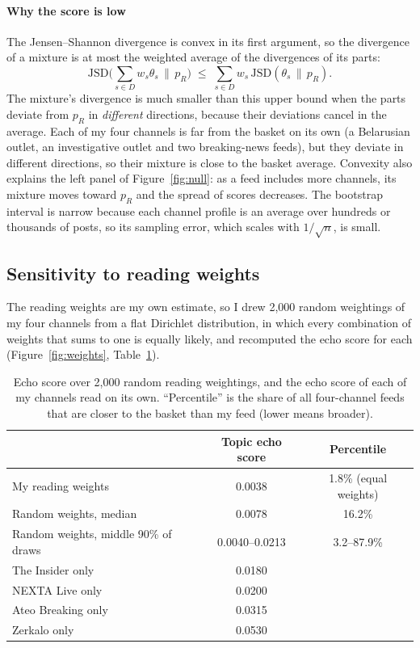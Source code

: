 \documentclass[11pt,a4paper]{article}
\newcommand{\JSD}{\mathrm{JSD}}
\begin{document}
\paragraph{Why the score is low} The Jensen--Shannon divergence is convex in its first argument, so the divergence of a mixture is at most the weighted average of the divergences of its parts:
\begin{equation}
\JSD\Big(\sum_{s\in D} w_s\theta_s \,\Big\|\, p_R\Big) \;\leq\; \sum_{s\in D} w_s\, \JSD(\theta_s\,\|\,p_R).
\end{equation}
The mixture's divergence is much smaller than this upper bound when the parts deviate from $p_R$ in \emph{different} directions, because their deviations cancel in the average. Each of my four channels is far from the basket on its own (a Belarusian outlet, an investigative outlet and two breaking-news feeds), but they deviate in different directions, so their mixture is close to the basket average. Convexity also explains the left panel of Figure~\ref{fig:null}: as a feed includes more channels, its mixture moves toward $p_R$ and the spread of scores decreases. The bootstrap interval is narrow because each channel profile is an average over hundreds or thousands of posts, so its sampling error, which scales with $1/\sqrt{n}$, is small.

\subsection{Sensitivity to reading weights}
\label{sec:weights}
The reading weights are my own estimate, so I drew 2,000 random weightings of my four channels from a flat Dirichlet distribution, in which every combination of weights that sums to one is equally likely, and recomputed the echo score for each (Figure~\ref{fig:weights}, Table~\ref{tab:single}).

\begin{table}[H]
\centering
\small
\caption{Echo score over 2,000 random reading weightings, and the echo score of each of my channels read on its own. ``Percentile'' is the share of all four-channel feeds that are closer to the basket than my feed (lower means broader).}
\label{tab:single}
\begin{tabular}{lcc}
\toprule
 & Topic echo score & Percentile \\
\midrule
My reading weights & 0.0038 & 1.8\% (equal weights) \\
Random weights, median & 0.0078 & 16.2\% \\
Random weights, middle 90\% of draws & 0.0040--0.0213 & 3.2--87.9\% \\
\midrule
The Insider only & 0.0180 & \\
NEXTA Live only & 0.0200 & \\
Ateo Breaking only & 0.0315 & \\
Zerkalo only & 0.0530 & \\
\bottomrule
\end{tabular}
\end{table}
\end{document}
